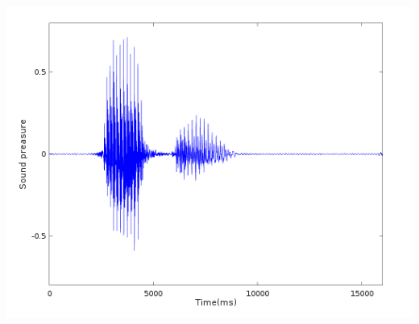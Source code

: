 \documentclass[twoside]{article}
\newenvironment{Figure}
  {\par\medskip\noindent\minipage{\linewidth}}
  {\endminipage\par\medskip}
\begin{document}
\begin{multicols}{2}
\begin{Figure}
	\centering
	\includegraphics[width=1.0\textwidth]{happy-read1}
	\label{img:pocetnoStanje}
\end{Figure}


\end{multicols}
\end{document}
